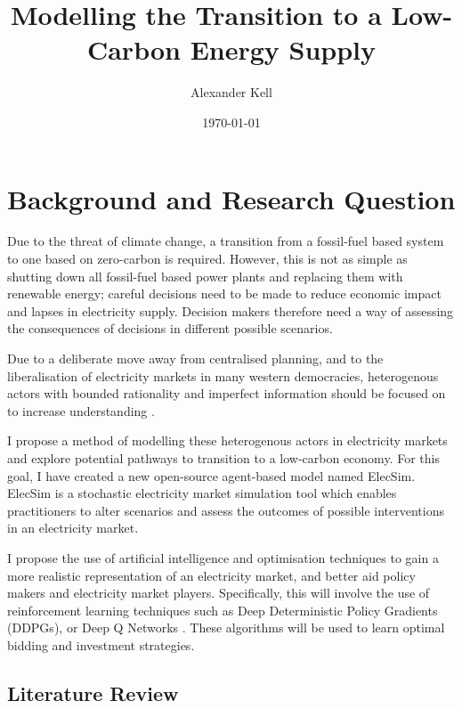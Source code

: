 \documentclass[12pt]{article}
\title{Modelling the Transition to a Low-Carbon Energy Supply}
\author{Alexander Kell}
\date{\today}
\begin{document}
\maketitle

\clearpage

\section{Background and Research Question}



Due to the threat of climate change, a transition from a fossil-fuel based system to one based on zero-carbon is required. However, this is not as simple as shutting down all fossil-fuel based power plants and replacing them with renewable energy; careful decisions need to be made to reduce economic impact and lapses in electricity supply. Decision makers therefore need a way of assessing the consequences of decisions in different possible scenarios. 

Due to a deliberate move away from centralised planning, and to the liberalisation of electricity markets in many western democracies, heterogenous actors with bounded rationality and imperfect information should be focused on to increase understanding \cite{Kraan2018}.

I propose a method of modelling these heterogenous actors in electricity markets and explore potential pathways to transition to a low-carbon economy. For this goal, I have created a new open-source agent-based model named ElecSim. ElecSim is a stochastic electricity market simulation tool which enables practitioners to alter scenarios and assess the outcomes of possible interventions in an electricity market.

I propose the use of artificial intelligence and optimisation techniques to gain a more realistic representation of an electricity market, and better aid policy makers and electricity market players. Specifically, this will involve the use of reinforcement learning techniques such as Deep Deterministic Policy Gradients (DDPGs)\cite{Hunt2016}, or Deep Q Networks \cite{Mnih2013}. These algorithms will be used to learn optimal bidding and investment strategies.


\subsection{Literature Review}
\end{document}
